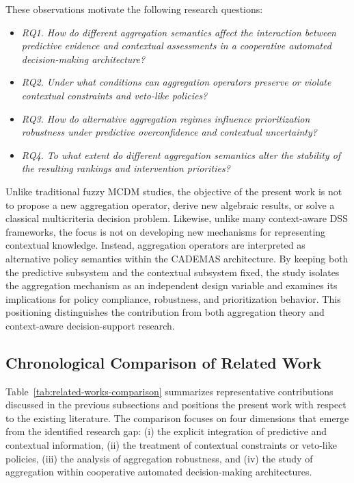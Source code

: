 \documentclass[mathematics,article,submit,moreauthors]{Definitions/mdpi}
\begin{document}
These observations motivate the following research questions:

\begin{itemize}
\item \textit{RQ1. How do different aggregation semantics affect the interaction between predictive evidence and contextual assessments in a cooperative automated decision-making architecture?}
\item \textit{RQ2. Under what conditions can aggregation operators preserve or violate contextual constraints and veto-like policies?}
\item \textit{RQ3. How do alternative aggregation regimes influence prioritization robustness under predictive overconfidence and contextual uncertainty?}
\item \textit{RQ4. To what extent do different aggregation semantics alter the stability of the resulting rankings and intervention priorities?}
\end{itemize}

Unlike traditional fuzzy MCDM studies, the objective of the present work
is not to propose a new aggregation operator, derive new algebraic
results, or solve a classical multicriteria decision problem.
Likewise, unlike many context-aware DSS frameworks, the focus is not on
developing new mechanisms for representing contextual knowledge.
Instead, aggregation operators are interpreted as alternative policy
semantics within the CADEMAS architecture. By keeping both the
predictive subsystem and the contextual subsystem fixed, the study
isolates the aggregation mechanism as an independent design variable and
examines its implications for policy compliance, robustness, and
prioritization behavior. This positioning distinguishes the contribution
from both aggregation theory and context-aware decision-support
research.

\subsection{Chronological Comparison of Related Work}
\label{subsec:chronological-comparison}

Table~\ref{tab:related-works-comparison} summarizes representative
contributions discussed in the previous subsections and positions the
present work with respect to the existing literature. The comparison
focuses on four dimensions that emerge from the identified research
gap: (i) the explicit integration of predictive and contextual
information, (ii) the treatment of contextual constraints or veto-like
policies, (iii) the analysis of aggregation robustness, and (iv) the
study of aggregation within cooperative automated decision-making
architectures.
 
\end{document}
